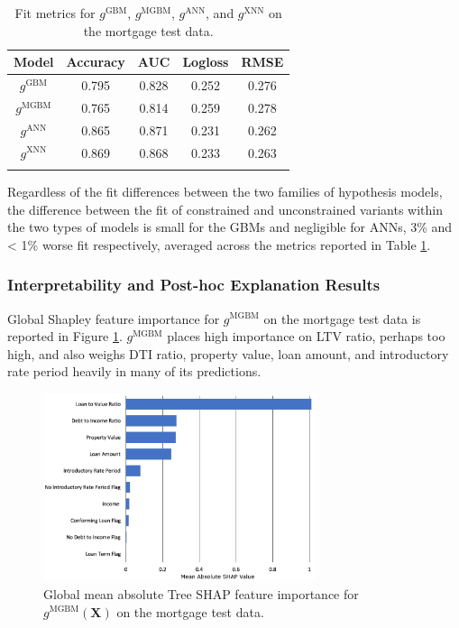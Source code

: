 \documentclass[information,article,submit,moreauthors,pdftex]{definitions/mdpi}
\begin{document}
\begin{table}[H]
\caption{Fit metrics for $g^\text{GBM}$, $g^\text{MGBM}$, $g^\text{ANN}$, and $g^\text{XNN}$ on the mortgage test data.}
\centering
\begin{tabular}{ccccc}
\toprule
\textbf{Model}		& \textbf{Accuracy}	& \textbf{AUC}	 & \textbf{Logloss}	& \textbf{RMSE}\\
\midrule	
$g^\text{GBM}$		& 0.795	& 0.828	& 0.252	& 0.276 \\
$g^\text{MGBM}$		& 0.765	& 0.814	& 0.259	& 0.278 \\
$g^\text{ANN}$		& 0.865	& 0.871	& 0.231	& 0.262 \\
$g^\text{XNN}$		& 0.869	& 0.868	& 0.233	& 0.263 \\
\bottomrule
\label{tab:mort_acc}
\end{tabular}
\end{table}

\noindent Regardless of the fit differences between the two families of hypothesis models, the difference between the fit of constrained and unconstrained variants within the two types of models is small for the GBMs and negligible for ANNs, 3\% and < 1\% worse fit respectively, averaged across the metrics reported in Table \ref{tab:mort_acc}. 

\subsubsection{Interpretability and Post-hoc Explanation Results}

Global Shapley feature importance for $g^\text{MGBM}$ on the mortgage test data is reported in Figure \ref{fig:mort_mgbm_glob}. $g^\text{MGBM}$ places high importance on LTV ratio, perhaps too high, and also weighs DTI ratio, property value, loan amount, and introductory rate period heavily in many of its predictions. 

\begin{figure}[H]
\centering
\includegraphics[width=8cm]{img/mort_mgbm_glob.png}
\caption{Global mean absolute Tree SHAP feature importance for $g^\text{MGBM}(\mathbf{X})$ on the mortgage test data.}
\label{fig:mort_mgbm_glob}
\end{figure} 
\end{document}
